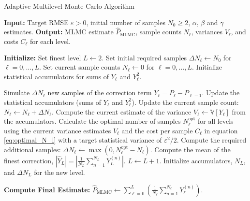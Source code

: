 \begin{algorithm}
\caption{Adaptive Multilevel Monte Carlo Algorithm}
\label{alg:mlmc_detailed}
\begin{algorithmic}[1]
\Statex \textbf{Input:} Target RMSE $\varepsilon > 0$, initial number of samples
$N_0 \ge 2$, $\alpha$, $\beta$ and $\gamma$ estimates.
\Statex \textbf{Output:} MLMC estimate $\hat{P}_{\mathrm{MLMC}}$, sample counts
$N_\ell$, variances $V_\ell$, and costs $C_\ell$ for each level.

\State \textbf{Initialize:}
\State Set finest level $L \gets 2$.
\State Set initial required samples $\Delta N_\ell \gets N_0$ for $\ell = 0, 
\dots, L$.
\State Set current sample counts $N_\ell \gets 0$ for $\ell = 0, \dots, L$.
\State Initialize statistical accumulators for sums of $Y_\ell$ and $Y_\ell^2$.

\State
{} 
    \State {}
            \State Simulate $\Delta N_\ell$ new samples of the correction term 
            $Y_\ell = P_\ell - P_{\ell-1}$.
            \State Update the statistical accumulators (sums of $Y_\ell$ and 
            $Y_\ell^2$).
            \State Update the current sample count: $N_\ell \gets N_\ell + 
            \Delta N_\ell$.
        \EndIf
    \EndFor
    \State
    \State {}
        \State Compute the current estimate of the variance $V_\ell \gets 
        \mathbb{V}[Y_\ell]$ from the accumulators.
    \EndFor
    \State Calculate the optimal number of samples $N_\ell^{\text{opt}}$ for all 
    levels using the current variance estimates $V_\ell$ and the cost per sample 
    $C_\ell$ in equation \eqref{eq:optimal_N_l} with a target statistical variance of $\varepsilon^2/2$.
    \State Compute the required additional samples: $\Delta N_\ell \gets \max(0, 
    N_\ell^{\text{opt}} - N_\ell)$.
    \State
    \State {}
     
        \State Compute the mean of the finest correction, $|\hat{Y}_L| = 
        \left|\frac{1}{N_L}\sum_{n=1}^{N_L}Y_L^{(n)}\right|$.
         
            \State $L \gets L+1$. 
            \State Initialize accumulators, $N_L$, and $\Delta N_L$ for the 
            new level.
        \EndIf
    \EndIf
\EndWhile

\State
\State \textbf{Compute Final Estimate:} $\hat{P}_{\mathrm{MLMC}} \gets 
\sum_{\ell=0}^L \left( \frac{1}{N_\ell} \sum_{n=1}^{N_\ell} Y_\ell^{(n)} \right)$.
\end{algorithmic}
\end{algorithm}
